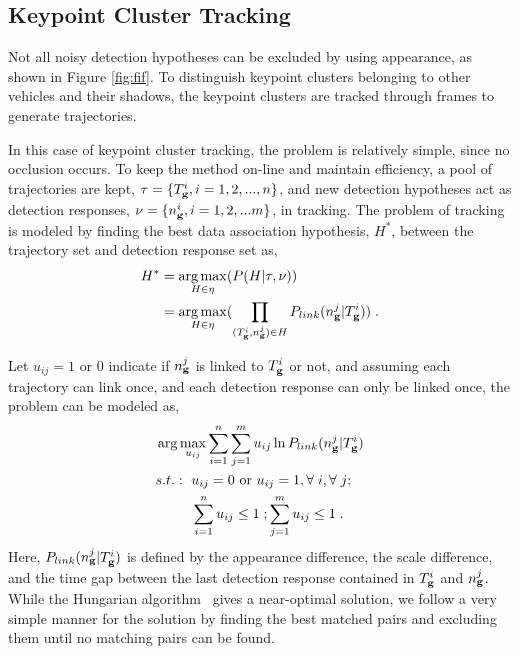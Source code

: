 \subsection{Keypoint Cluster Tracking}

Not all noisy detection hypotheses can be excluded by using appearance, as shown in Figure \ref{fig:fif}. To distinguish keypoint clusters belonging to other vehicles and their shadows, the keypoint clusters are tracked through frames to generate trajectories.

In this case of keypoint cluster tracking, the problem is relatively simple, since no occlusion occurs. To keep the method on-line and maintain efficiency, a pool of trajectories are kept, $\tau=\{T_{\bf{g}}^i,i=1,2,...,n\}$, and new detection hypotheses act as detection responses, $\nu=\{n_{\bf{g}}^i,i=1,2,...m\}$, in tracking. The problem of tracking is modeled by finding the best data association hypothesis, $H^*$, between the trajectory set and detection response set as,
\begin{equation}
\begin{aligned}
{H^*} &= \mathop {\arg \max }\limits_{H \in \eta
} (P(H|\tau,\nu )) \\
&= \mathop {\arg \max }\limits_{H \in \eta }
(\prod\limits_{(T_{\bf{g}}^i,n_{\bf{g}}^j) \in H} {P_{link}(n_{\bf{g}}^j|T_{\bf{g}}^i)} ) \;.
\end{aligned}
\label{eq3}
\end{equation}

Let $u_{ij}=1 \mbox{ or } 0$ indicate if $n_{\bf{g}}^j$ is linked to $T_{\bf{g}}^i$ or not, and assuming each trajectory can link once, and each detection response can only be linked once, the problem can be modeled as,
\[
\begin{aligned}
&\arg \max\limits_{u_{ij}} \sum\limits_{i = 1}^n \sum\limits_{j = 1}^m u_{ij} \ln P_{link}(n_{\bf{g}}^j|T_{\bf{g}}^i)\\
&
\begin{aligned}
    s.t.:\mbox{ }&u_{ij}=0\mbox{ or }u_{ij}=1,\forall\;i,\forall\;j;\\
    &\sum\limits_{i = 1}^n {u_{ij}} \leq 1\;; \sum\limits_{j = 1}^m {u_{ij}}\leq 1\;.
\end{aligned}
\end{aligned}
\]
Here, $P_{link}(n_{\bf{g}}^j|T_{\bf{g}}^i)$ is defined by the appearance difference, the scale difference, and the time gap between the last detection response contained in $T_{\bf{g}}^i$ and $n_{\bf{g}}^j$. While the Hungarian algorithm~\citep{ha} gives a near-optimal solution, we follow a very simple manner for the solution by finding the best matched pairs and excluding them until no matching pairs can be found.

